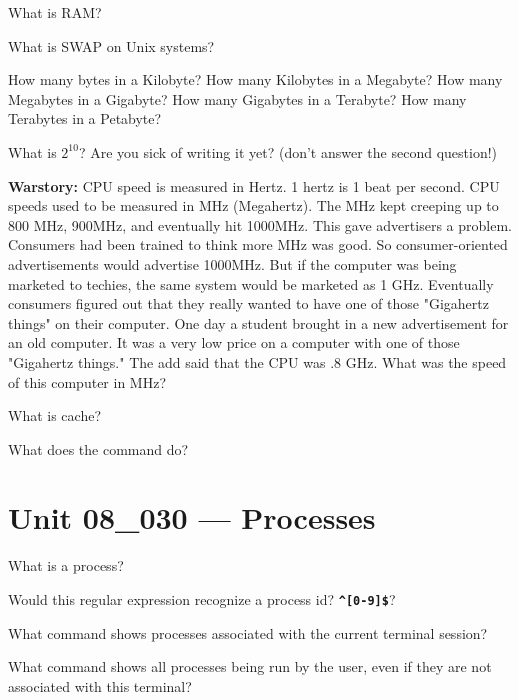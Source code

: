 \documentclass[letterpaper,12pt]{exam}
\newcommand{\unit}{Unit 08}
\begin{document}
\begin {questions}
\begin{samepage}
\question What is RAM? 
\vspace{5mm}
\end{samepage}

\question What is SWAP on Unix systems?
\begin{samepage}
\question How many bytes in a Kilobyte?
\question How many Kilobytes in a Megabyte?
\question How many Megabytes in a Gigabyte?
\question How many Gigabytes in a Terabyte?
\question How many Terabytes in a Petabyte?
\end{samepage}

\question What is $2^{10}$?  Are you sick of writing it yet? (don't answer the second question!)
\vspace{20mm}
\begin {samepage}

\noindent \textbf{Warstory:}  CPU speed is measured in Hertz.  1 hertz is 1 beat per second.  CPU speeds used to be measured in MHz (Megahertz).  The MHz kept creeping up to 800 MHz, 900MHz, and eventually hit 1000MHz.  This gave advertisers a problem.  Consumers had been trained to think more MHz was good.  So consumer-oriented advertisements would advertise 1000MHz.  But if the computer was being marketed to techies, the same system would be marketed as 1 GHz.  Eventually consumers figured out that they really wanted to have one of those "Gigahertz things" on their computer.  
\question One day a student brought in a new advertisement for an old computer.  It was a very low price on a computer with one of those "Gigahertz things."  The add said that the CPU was .8 GHz.   What was the speed of this computer in MHz?
\vspace{15mm}

\end{samepage}
\begin{samepage}
\question What is cache?  
\vspace{5mm}
\end{samepage}

\question What does the  command do?

\section*{\unit\_030 --- Processes}

\question What is a process?

\question Would this regular expression recognize a process id?  \texttt{\textbf{\textquotesingle\^{}[0-9]\$\textquotesingle}}?

\question What command shows processes associated with the current terminal session?

\question What command shows all processes being run by the user, even if they are not associated with this terminal?











\end{questions}
\noindent 
\end{document}
